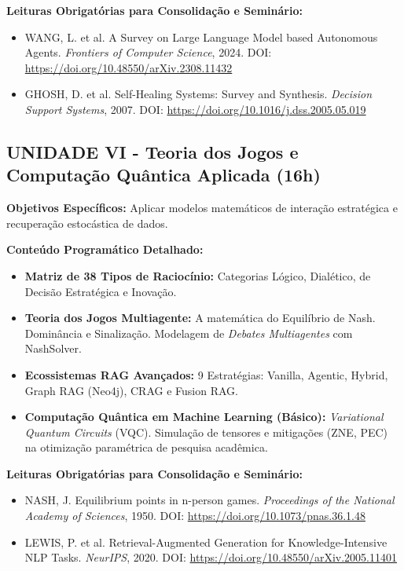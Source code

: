 \documentclass[12pt,a4paper]{article}
\begin{document}
\textbf{Leituras Obrigatórias para Consolidação e Seminário:}
\begin{itemize}
    \item WANG, L. et al. A Survey on Large Language Model based Autonomous Agents. \textit{Frontiers of Computer Science}, 2024. DOI: \url{https://doi.org/10.48550/arXiv.2308.11432}
    \item GHOSH, D. et al. Self-Healing Systems: Survey and Synthesis. \textit{Decision Support Systems}, 2007. DOI: \url{https://doi.org/10.1016/j.dss.2005.05.019}
\end{itemize}

\subsection{UNIDADE VI - Teoria dos Jogos e Computação Quântica Aplicada (16h)}
\textbf{Objetivos Específicos:} Aplicar modelos matemáticos de interação estratégica e recuperação estocástica de dados.

\textbf{Conteúdo Programático Detalhado:}
\begin{itemize}
    \item \textbf{Matriz de 38 Tipos de Raciocínio:} Categorias Lógico, Dialético, de Decisão Estratégica e Inovação.
    \item \textbf{Teoria dos Jogos Multiagente:} A matemática do Equilíbrio de Nash. Dominância e Sinalização. Modelagem de \textit{Debates Multiagentes} com NashSolver.
    \item \textbf{Ecossistemas RAG Avançados:} 9 Estratégias: Vanilla, Agentic, Hybrid, Graph RAG (Neo4j), CRAG e Fusion RAG.
    \item \textbf{Computação Quântica em Machine Learning (Básico):} \textit{Variational Quantum Circuits} (VQC). Simulação de tensores e mitigações (ZNE, PEC) na otimização paramétrica de pesquisa acadêmica.
\end{itemize}

\textbf{Leituras Obrigatórias para Consolidação e Seminário:}
\begin{itemize}
    \item NASH, J. Equilibrium points in n-person games. \textit{Proceedings of the National Academy of Sciences}, 1950. DOI: \url{https://doi.org/10.1073/pnas.36.1.48}
    \item LEWIS, P. et al. Retrieval-Augmented Generation for Knowledge-Intensive NLP Tasks. \textit{NeurIPS}, 2020. DOI: \url{https://doi.org/10.48550/arXiv.2005.11401}
\end{itemize}
\end{document}
